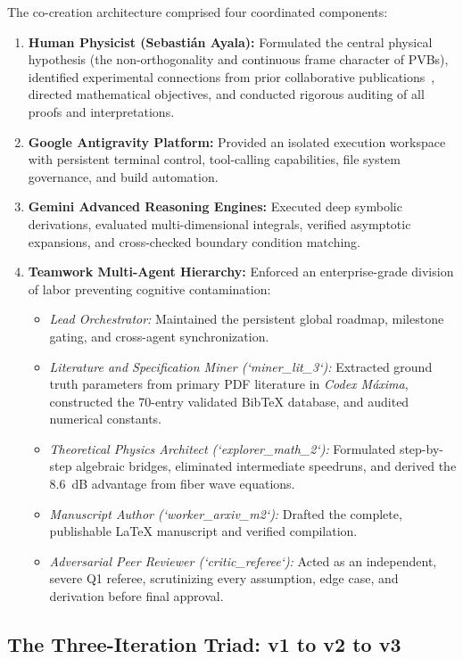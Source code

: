 \documentclass[11pt,a4paper]{article}
\begin{document}
The co-creation architecture comprised four coordinated components:
\begin{enumerate}
    \item \textbf{Human Physicist (Sebastián Ayala):} Formulated the central physical hypothesis (the non-orthogonality and continuous frame character of PVBs), identified experimental connections from prior collaborative publications~\cite{Villalba2023,RojasRojas2021,Canas2021,Ferreira2026}, directed mathematical objectives, and conducted rigorous auditing of all proofs and interpretations.
    \item \textbf{Google Antigravity Platform:} Provided an isolated execution workspace with persistent terminal control, tool-calling capabilities, file system governance, and build automation.
    \item \textbf{Gemini Advanced Reasoning Engines:} Executed deep symbolic derivations, evaluated multi-dimensional integrals, verified asymptotic expansions, and cross-checked boundary condition matching.
    \item \textbf{Teamwork Multi-Agent Hierarchy:} Enforced an enterprise-grade division of labor preventing cognitive contamination:
    \begin{itemize}
        \item \emph{Lead Orchestrator:} Maintained the persistent global roadmap, milestone gating, and cross-agent synchronization.
        \item \emph{Literature and Specification Miner (`miner\_lit\_3`):} Extracted ground truth parameters from primary PDF literature in \emph{Codex Máxima}, constructed the 70-entry validated BibTeX database, and audited numerical constants.
        \item \emph{Theoretical Physics Architect (`explorer\_math\_2`):} Formulated step-by-step algebraic bridges, eliminated intermediate speedruns, and derived the 8.6~dB advantage from fiber wave equations.
        \item \emph{Manuscript Author (`worker\_arxiv\_m2`):} Drafted the complete, publishable LaTeX manuscript and verified compilation.
        \item \emph{Adversarial Peer Reviewer (`critic\_referee`):} Acted as an independent, severe Q1 referee, scrutinizing every assumption, edge case, and derivation before final approval.
    \end{itemize}
\end{enumerate}

\subsection{The Three-Iteration Triad: v1 to v2 to v3}
\end{document}
